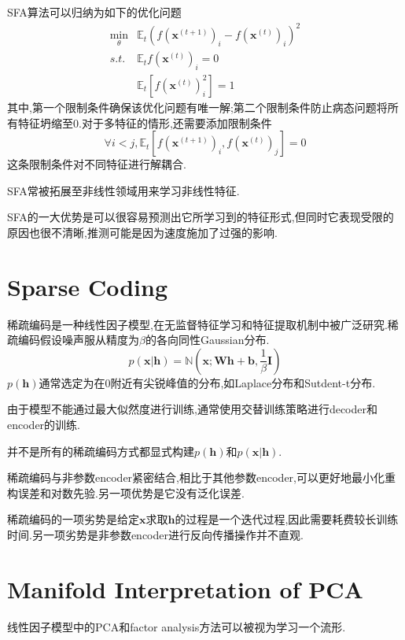 SFA算法可以归纳为如下的优化问题
\begin{equation}\begin{split}
\min_{\theta}&\mathbb E_t(f(\mathbf x^{(t+1)})_i-f(\mathbf x^{(t)})_i)^2\\
s.t.&\mathbb E_tf(\mathbf x^{(t)})_i=0\\
&\mathbb E_t[f(\mathbf x^{(t)})_i^2]=1
\end{split}\end{equation}
其中,第一个限制条件确保该优化问题有唯一解;第二个限制条件防止病态问题将所有特征坍缩至$0$.对于多特征的情形,还需要添加限制条件
\begin{equation}
\forall i<j,\mathbb E_t[f(\mathbf x^{(t+1)})_i,f(\mathbf x^{(t)})_j]=0
\end{equation}
这条限制条件对不同特征进行解耦合.

SFA常被拓展至非线性领域用来学习非线性特征.

SFA的一大优势是可以很容易预测出它所学习到的特征形式,但同时它表现受限的原因也很不清晰,推测可能是因为速度施加了过强的影响.

\section{Sparse Coding}

稀疏编码是一种线性因子模型,在无监督特征学习和特征提取机制中被广泛研究.稀疏编码假设噪声服从精度为$\beta$的各向同性Gaussian分布.
\begin{equation}
p(\mathbf{x|h})=\mathbb N(\mathbf{x;Wh+b},\frac{1}{\beta}\mathbf I)
\end{equation}
$p(\mathbf h)$通常选定为在$0$附近有尖锐峰值的分布,如Laplace分布和Sutdent-t分布.

由于模型不能通过最大似然度进行训练,通常使用交替训练策略进行decoder和encoder的训练.

并不是所有的稀疏编码方式都显式构建$p(\mathbf h)$和$p(\mathbf{x|h})$.

稀疏编码与非参数encoder紧密结合,相比于其他参数encoder,可以更好地最小化重构误差和对数先验.另一项优势是它没有泛化误差.

稀疏编码的一项劣势是给定$\mathbf x$求取$\mathbf h$的过程是一个迭代过程,因此需要耗费较长训练时间.另一项劣势是非参数encoder进行反向传播操作并不直观.

\section{Manifold Interpretation of PCA}

线性因子模型中的PCA和factor analysis方法可以被视为学习一个流形.

